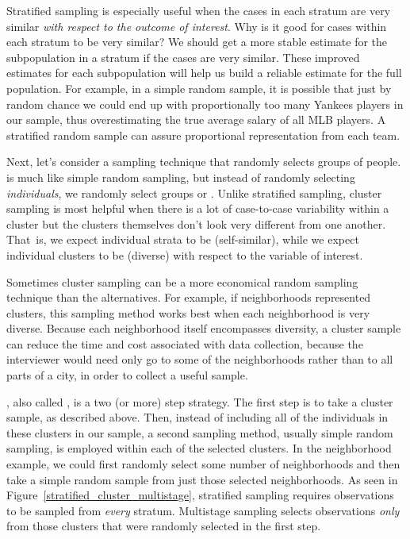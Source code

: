 \begin{examplewrap}
\begin{nexample}{Stratified sampling is especially useful when the cases in each stratum are very similar \emph{with respect to the outcome of interest}. Why is it good for cases within each stratum to be very similar?}
We should get a more stable estimate for the subpopulation in a stratum if the cases are very similar. These improved estimates for each subpopulation will help us build a reliable estimate for the full population. For example, in a simple random sample, it is possible that just by random chance we could end up with proportionally too many Yankees players in our sample, thus overestimating the true average salary of all MLB players. A stratified random sample can assure proportional representation from each team.
\end{nexample}
\end{examplewrap}

Next, let's consider a sampling technique that randomly selects groups of people.  is much like simple random sampling, but instead of randomly selecting \emph{individuals}, we randomly select groups or . Unlike stratified sampling, cluster sampling is most helpful when there is a lot of case-to-case variability within a cluster but the clusters themselves don't look very different from one another. That~is, we expect individual strata to be  (self-similar), while we expect individual clusters to be  (diverse) with respect to the variable of interest.  

Sometimes cluster sampling can be a more economical random sampling technique than the alternatives. For example, if neighborhoods represented clusters, this sampling method works best when each neighborhood is very diverse. Because each neighborhood itself encompasses diversity, a cluster sample can reduce the time and cost associated with data collection, because the interviewer would need only go to some of the neighborhoods rather than to all parts of a city, in order to collect a useful sample.

, also called , is a two (or more) step strategy. The first step is to take a cluster sample, as described above. Then, instead of including all of the individuals in these clusters in our sample, a second sampling method, usually simple random sampling, is employed within each of the selected clusters. In the neighborhood example, we could first randomly select some number of neighborhoods and then take a simple random sample from just those selected neighborhoods. As seen in Figure~\ref{stratified_cluster_multistage}, stratified sampling requires observations to be sampled from \emph{every} stratum. Multistage sampling selects observations \emph{only} from those clusters that were randomly selected in the first step.

